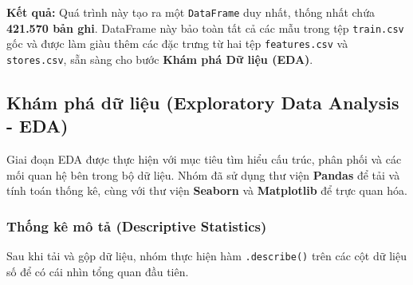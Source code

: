\noindent
\textbf{Kết quả:}  
Quá trình này tạo ra một \texttt{DataFrame} duy nhất, thống nhất chứa \textbf{421.570 bản ghi}.  
DataFrame này bảo toàn tất cả các mẫu trong tệp \texttt{train.csv} gốc và được làm giàu thêm các đặc trưng từ hai tệp \texttt{features.csv} và \texttt{stores.csv}, sẵn sàng cho bước \textbf{Khám phá Dữ liệu (EDA)}.

\subsection{Khám phá dữ liệu (Exploratory Data Analysis - EDA)}

Giai đoạn EDA được thực hiện với mục tiêu tìm hiểu cấu trúc, phân phối và các mối quan hệ bên trong bộ dữ liệu. 
Nhóm đã sử dụng thư viện \textbf{Pandas} để tải và tính toán thống kê, 
cùng với thư viện \textbf{Seaborn} và \textbf{Matplotlib} để trực quan hóa.

\subsubsection{Thống kê mô tả (Descriptive Statistics)}

Sau khi tải và gộp dữ liệu, nhóm thực hiện hàm \texttt{.describe()} trên các cột dữ liệu số 
để có cái nhìn tổng quan đầu tiên.

